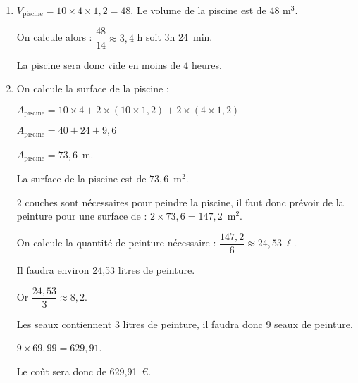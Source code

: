 
\medskip

%
%

\begin{enumerate}
\item %
$V_{\text{piscine}} = 10 \times  4 \times 1,2 = 48$. Le volume de la piscine est de 48 m$^3$.

On calcule alors : $\dfrac{48}{14} \approx 3,4$ h soit 3h 24~min.

La piscine sera donc vide en moins de 4 heures.
\item %
On calcule la surface de la piscine :

$A_{\text{piscine}} = 10 \times 4 + 2 \times(10 \times1,2) + 2 \times(4 \times1,2)$

$A_{\text{piscine}} = 40 + 24 + 9,6$

$A_{\text{piscine}} = 73,6$~m.

La surface de la piscine est de $73,6$~m$^2$.

2 couches sont nécessaires pour peindre la piscine, il faut donc prévoir de la peinture pour
une surface de : $2 \times  73,6 = 147,2$~m$^2$.

On  calcule la quantité de peinture nécessaire : $\dfrac{147,2}{6} \approx 24,53~\ell$.

Il faudra environ 24,53 litres de peinture.

Or $\dfrac{24,53}{3} \approx  8,2$.

Les seaux contiennent 3 litres de peinture, il faudra donc 9 seaux de peinture.

$9 \times 69,99 = 629,91$.

Le coût sera donc de 629,91~\euro.
\end{enumerate}

